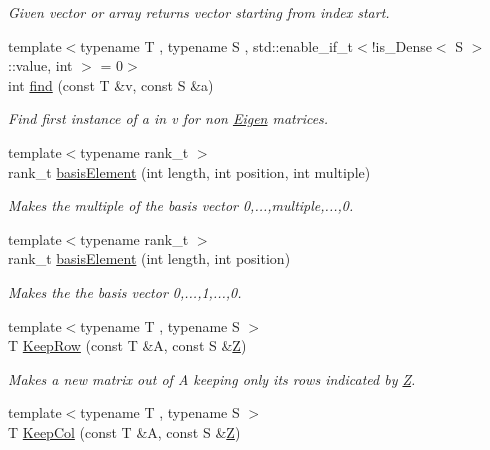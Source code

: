 \begin{DoxyCompactItemize}
\begin{DoxyCompactList}\small\item\em Given vector or array returns vector starting from index start. \end{DoxyCompactList}\item 
{\footnotesize template$<$typename T , typename S , std\+::enable\+\_\+if\+\_\+t$<$!is\+\_\+\+Dense$<$ S $>$\+::value, int $>$  = 0$>$ }\\int \hyperlink{namespaceMackey_a91104eaef1ab349e68f0623cfaaf45c0}{find} (const T \&v, const S \&a)
\begin{DoxyCompactList}\small\item\em Find first instance of a in v for non \hyperlink{namespaceEigen}{Eigen} matrices. \end{DoxyCompactList}\item 
{\footnotesize template$<$typename rank\+\_\+t $>$ }\\rank\+\_\+t \hyperlink{namespaceMackey_ac2e368bf7d802f2fc47e39a71a5a1630}{basis\+Element} (int length, int position, int multiple)
\begin{DoxyCompactList}\small\item\em Makes the multiple of the basis vector 0,...,multiple,...,0. \end{DoxyCompactList}\item 
{\footnotesize template$<$typename rank\+\_\+t $>$ }\\rank\+\_\+t \hyperlink{namespaceMackey_aa10c6cbea565e024a38b446139800b69}{basis\+Element} (int length, int position)
\begin{DoxyCompactList}\small\item\em Makes the the basis vector 0,...,1,...,0. \end{DoxyCompactList}\item 
{\footnotesize template$<$typename T , typename S $>$ }\\T \hyperlink{namespaceMackey_ad6870101d4fd762100a3115abc4a15db}{Keep\+Row} (const T \&A, const S \&\hyperlink{classZ}{Z})
\begin{DoxyCompactList}\small\item\em Makes a new matrix out of A keeping only its rows indicated by \hyperlink{classZ}{Z}. \end{DoxyCompactList}\item 
{\footnotesize template$<$typename T , typename S $>$ }\\T \hyperlink{namespaceMackey_a9a8496759bc7bb14dcaa2284ae1d0491}{Keep\+Col} (const T \&A, const S \&\hyperlink{classZ}{Z})

\end{DoxyCompactItemize}
